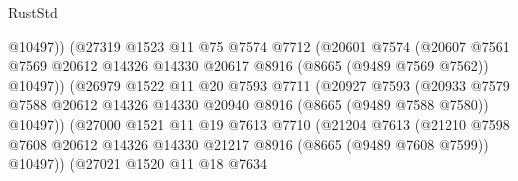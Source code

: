 \begin{lexlean}{RustStd}
\begin{coremodule}
                                  @10497))
                              (@27319
                                @1523
                                @11
                                @75
                                @7574
                                @7712
                                (@20601
                                  @7574
                                  (@20607
                                    @7561
                                    @7569
                                    @20612
                                    @14326
                                    @14330
                                    @20617
                                    @8916
                                    (@8665 (@9489 @7569 @7562))
                                    @10497))
                                (@26979
                                  @1522
                                  @11
                                  @20
                                  @7593
                                  @7711
                                  (@20927
                                    @7593
                                    (@20933
                                      @7579
                                      @7588
                                      @20612
                                      @14326
                                      @14330
                                      @20940
                                      @8916
                                      (@8665 (@9489 @7588 @7580))
                                      @10497))
                                  (@27000
                                    @1521
                                    @11
                                    @19
                                    @7613
                                    @7710
                                    (@21204
                                      @7613
                                      (@21210
                                        @7598
                                        @7608
                                        @20612
                                        @14326
                                        @14330
                                        @21217
                                        @8916
                                        (@8665 (@9489 @7608 @7599))
                                        @10497))
                                    (@27021
                                      @1520
                                      @11
                                      @18
                                      @7634

\end{coremodule}
\end{lexlean}
